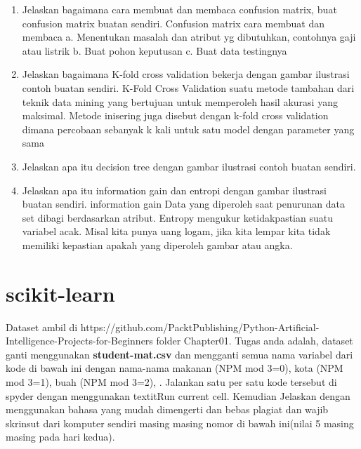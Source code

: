 \begin{enumerate}
\item
Jelaskan bagaimana cara membuat dan membaca confusion matrix, buat confusion matrix buatan sendiri.
Confusion matrix 
 cara membuat dan membaca 
a.	Menentukan masalah dan atribut yg dibutuhkan, contohnya gaji atau listrik
b.	Buat pohon keputusan
c.	Buat data testingnya

\item
Jelaskan bagaimana K-fold cross validation bekerja dengan gambar ilustrasi contoh buatan sendiri.
K-Fold Cross Validation
suatu metode tambahan dari teknik data mining yang bertujuan untuk memperoleh hasil akurasi yang maksimal. Metode inisering juga disebut dengan k-fold cross validation dimana percobaan sebanyak k kali untuk satu model dengan parameter yang sama

\item
Jelaskan apa itu decision tree dengan gambar ilustrasi contoh buatan sendiri.
\item
Jelaskan apa itu information gain dan entropi dengan gambar ilustrasi buatan sendiri.
information gain  Data yang diperoleh saat penurunan data set dibagi berdasarkan atribut. 
Entropy mengukur ketidakpastian suatu variabel acak. Misal kita punya uang logam, jika kita lempar kita tidak memiliki kepastian apakah yang diperoleh gambar atau angka.



\end{enumerate}

\section{scikit-learn}
Dataset ambil di https://github.com/PacktPublishing/Python-Artificial-Intelligence-Projects-for-Beginners folder Chapter01.
Tugas anda adalah, dataset ganti menggunakan \textbf{student-mat.csv} dan mengganti semua nama variabel dari kode di bawah ini dengan nama-nama makanan (NPM mod 3=0), kota (NPM mod 3=1), buah (NPM mod 3=2), . Jalankan satu per satu kode tersebut di spyder dengan menggunakan textit{Run current cell}. Kemudian Jelaskan dengan menggunakan bahasa yang mudah dimengerti dan bebas plagiat dan wajib skrinsut dari komputer sendiri masing masing nomor di bawah ini(nilai 5 masing masing pada hari kedua).

